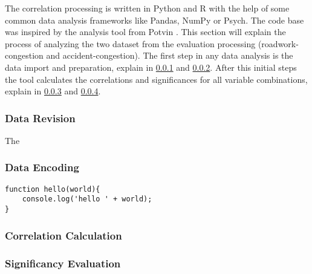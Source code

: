 The correlation processing is written in Python and R with the help of some common data analysis frameworks like Pandas, NumPy or Psych. The code base was inspired by the analysis tool from Potvin \parencite{Potvin2020}. This section will explain the process of analyzing the two dataset from the evaluation processing (roadwork-congestion and accident-congestion). The first step in any data analysis is the data import and preparation, explain in \cref{methodology_correlation_processing_revision} and \cref{methodology_correlation_processing_encoding}. After this initial steps the tool calculates the correlations and significances for all variable combinations, explain in \cref{methodology_correlation_processing_correlation} and \cref{methodology_correlation_processing_significanc}. 

\subsubsection{Data Revision}
\label{methodology_correlation_processing_revision}
The 

\subsubsection{Data Encoding}
\label{methodology_correlation_processing_encoding}

\begin{lstlisting}[style=js, caption={Beispiellisting}, label=lst:sample] 
function hello(world){
    console.log('hello ' + world);
}
\end{lstlisting}


\subsubsection{Correlation Calculation}
\label{methodology_correlation_processing_correlation}

\subsubsection{Significancy Evaluation}
\label{methodology_correlation_processing_significanc}




